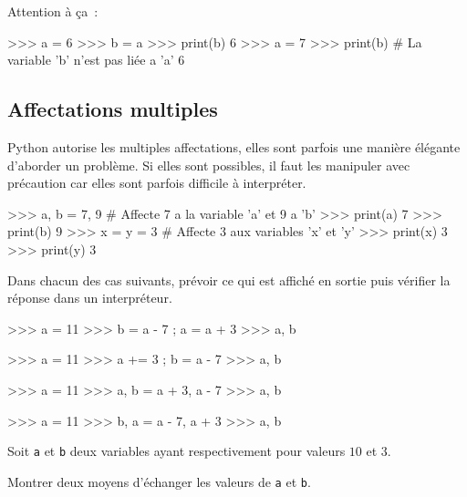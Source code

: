 {\begin{remarque}
Attention à ça~:
\begin{pythoncode}
>>> a = 6
>>> b = a
>>> print(b)
6
>>> a = 7
>>> print(b)               # La variable 'b' n'est pas liée a 'a'
6
\end{pythoncode}
\end{remarque}

\subsection{Affectations multiples}
Python autorise les multiples affectations, elles sont parfois une manière élégante d'aborder
un problème. Si elles sont possibles, il faut les manipuler avec précaution car elles sont parfois
difficile à interpréter.

\begin{pythoncode}
>>> a, b = 7, 9       # Affecte 7 a la variable 'a' et 9 a 'b'
>>> print(a)
7
>>> print(b)
9
>>> x = y = 3         # Affecte 3 aux variables 'x' et 'y'
>>> print(x)
3
>>> print(y)
3
\end{pythoncode}

\begin{exercice}
Dans chacun des cas suivants, prévoir ce qui est affiché en sortie puis vérifier la réponse dans
    un interpréteur.
    \begin{multicols}{2}
\begin{pythonexemple}
>>> a = 11
>>> b = a - 7 ; a = a + 3
>>> a, b
\end{pythonexemple}

\begin{pythonexemple}
>>> a = 11
>>> a += 3 ; b = a - 7
>>> a, b
\end{pythonexemple}

\begin{pythonexemple}
>>> a = 11
>>> a, b = a + 3, a - 7
>>> a, b
\end{pythonexemple}

\begin{pythonexemple}
>>> a = 11
>>> b, a = a - 7, a + 3
>>> a, b
\end{pythonexemple}
    \end{multicols}
\end{exercice}

\begin{exercice}
Soit \texttt{a} et \texttt{b} deux variables ayant respectivement pour valeurs $10$ et $3$.

Montrer deux moyens d'échanger les valeurs de \texttt{a} et \texttt{b}.
\end{exercice}

}
